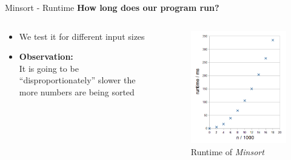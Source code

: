 
\begin{frame}{Minsort - Runtime}
  \textbf{How long does our program run?}
  \vspace{-0.5em}
  \begin{columns}
    \begin{column}[t]{0.5\textwidth}
      \begin{itemize}
        \item
          We test it for different input sizes
        \item
          \textbf{Observation:}\\
          It is going to be \enquote{disproportionately}
          slower the more numbers are being sorted
      \end{itemize}
    \end{column}
    \begin{column}[t]{0.45\textwidth}
      \begin{center}%
        \begin{figure}[!h]%
          \includegraphics[width=\textwidth]{Images/MinSort/Minsort.png}%
          \vspace*{-1.0em}\caption{Runtime of \textit{Minsort}}%
          \label{fig:minsort_runtime}%
        \end{figure}%
      \end{center}
    \end{column}
  \end{columns}
\end{frame}

